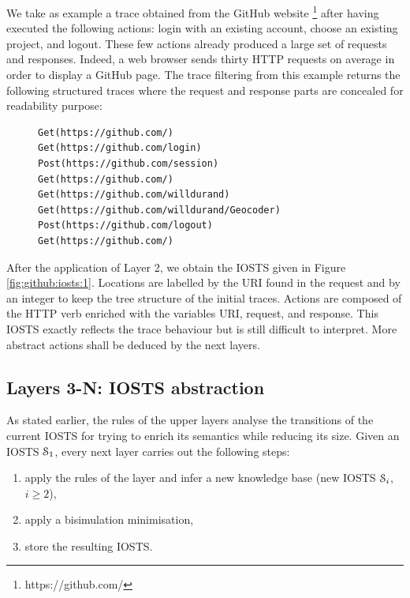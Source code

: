 \begin{example}
We take as example a trace obtained from the GitHub website
\footnote{https://github.com/} after having executed the
following actions: login with an existing account, choose an
existing project, and logout. These few actions already produced
a large set of requests and responses. Indeed, a web browser
sends thirty HTTP requests on average in order to display a
GitHub page. The trace filtering from this example returns the
following structured traces where the request and response parts
are concealed for readability purpose:

\begin{figure}[ht]
\begin{BVerbatim}
Get(https://github.com/)
Get(https://github.com/login)
Post(https://github.com/session)
Get(https://github.com/)
Get(https://github.com/willdurand)
Get(https://github.com/willdurand/Geocoder)
Post(https://github.com/logout)
Get(https://github.com/)
\end{BVerbatim}
\end{figure}

After the application of Layer 2, we obtain the IOSTS given in Figure
\ref{fig:github:iosts:1}. Locations are labelled by the URI found
in the request and by an integer to keep the tree structure of
the initial traces. Actions are composed of the HTTP verb
enriched with the variables URI, request, and response. This
IOSTS exactly reflects the trace behaviour but is still difficult
to interpret. More abstract actions shall be deduced by the next
layers.
\end{example}


\subsection{Layers 3-N: IOSTS abstraction}
\label{sec:modelinf:webapps:L4}

As stated earlier, the rules of the upper layers analyse the
transitions of the current IOSTS for trying to enrich its
semantics while reducing its size. Given an IOSTS
$\EuScript{S}_1$, every next layer carries out the following
steps:

\begin{enumerate}
\item apply the rules of the layer and infer a new knowledge base
(new IOSTS $\EuScript{S}_i$, $i\geq 2$),

\item apply a bisimulation minimisation,

\item store the resulting IOSTS.
\end{enumerate}

